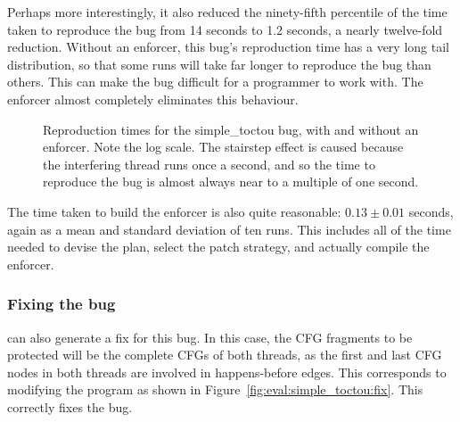 Perhaps more interestingly, it also reduced the ninety-fifth
percentile of the time taken to reproduce the bug from 14 seconds to
1.2 seconds, a nearly twelve-fold reduction.  Without an enforcer,
this bug's reproduction time has a very long tail distribution, so
that some runs will take far longer to reproduce the bug than others.
This can make the bug difficult for a programmer to work with.  The
enforcer almost completely eliminates this behaviour.

\begin{figure}
  
  \caption{Reproduction times for the simple\_toctou bug, with and
    without an enforcer.  Note the log scale.  The stairstep effect is
    caused because the interfering thread runs once a second, and so
    the time to reproduce the bug is almost always near to a multiple
    of one second.}
  \label{fig:eval:simple_toctou:repro_cdfs}
\end{figure}

The time taken to build the enforcer is also quite reasonable: $0.13
\pm 0.01$ seconds, again as a mean and standard deviation of ten runs.
This includes all of the time needed to devise the plan, select the
patch strategy, and actually compile the enforcer.

\subsubsection{Fixing the bug}
{\Implementation} can also generate a fix for this bug.  In this case,
the CFG fragments to be protected will be the complete CFGs of both
threads, as the first and last CFG nodes in both threads are involved
in happens-before edges.  This corresponds to modifying the program as
shown in Figure~\ref{fig:eval:simple_toctou:fix}.  This correctly
fixes the bug.

